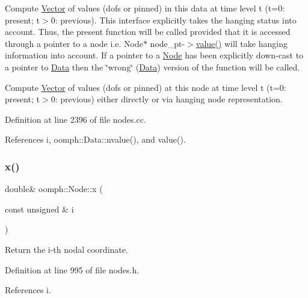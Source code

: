 Compute \hyperlink{classoomph_1_1Vector}{Vector} of values (dofs or pinned) in this data at time level t (t=0\+: present; t$>$0\+: previous). This interface explicitly takes the hanging status into account. Thus, the present function will be called provided that it is accessed through a pointer to a node i.\+e. Node$\ast$ node\+\_\+pt-\/$>$\hyperlink{classoomph_1_1Node_afcc5cdba40bca251826ae5bee5ca15b4}{value()} will take hanging information into account. If a pointer to a \hyperlink{classoomph_1_1Node}{Node} has been explicitly down-\/cast to a pointer to \hyperlink{classoomph_1_1Data}{Data} then the \char`\"{}wrong\char`\"{} (\hyperlink{classoomph_1_1Data}{Data}) version of the function will be called. 

Compute \hyperlink{classoomph_1_1Vector}{Vector} of values (dofs or pinned) at this node at time level t (t=0\+: present; t$>$0\+: previous) either directly or via hanging node representation. 

Definition at line 2396 of file nodes.\+cc.



References i, oomph\+::\+Data\+::nvalue(), and value().

\mbox{\label{classoomph_1_1Node_a056f8e82da938369cd38541c5cdc598a}} 
\subsubsection{\texorpdfstring{x()}{x()}\hspace{0.1cm}{\footnotesize\ttfamily [1/4]}}
{\footnotesize\ttfamily double\& oomph\+::\+Node\+::x (\begin{DoxyParamCaption}\item[{const unsigned \&}]{i }\end{DoxyParamCaption})\hspace{0.3cm}{\ttfamily [inline]}}



Return the i-\/th nodal coordinate. 



Definition at line 995 of file nodes.\+h.



References i.



